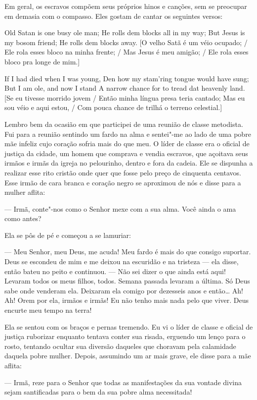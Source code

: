 Em geral, os escravos compõem seus
próprios hinos e canções, sem se preocupar em demasia com o compasso.
Eles gostam de cantar os seguintes versos:

Old Satan is one busy ole man; He rolls dem blocks all in my way; But
Jesus is my bosom friend; He rolls dem blocks away. {[}O velho Satã é um
véio ocupado; / Ele rola esses bloco na minha frente; / Mas Jesus é meu
amigão; / Ele rola esses bloco pra longe de mim.{]}

If I had died when I was young, Den how my stam'ring tongue would have
sung; But I am ole, and now I stand A narrow chance for to tread dat
heavenly land. {[}Se eu tivesse morrido jovem / Então minha língua presa
teria cantado; Mas eu sou véio e aqui estou, / Com pouca chance de
trilhá o terreno celestial.{]}

Lembro bem da ocasião em que participei
de uma reunião de classe metodista. Fui para a reunião sentindo um fardo
na alma e sentei"-me ao lado de uma pobre mãe infeliz cujo coração sofria
mais do que meu. O líder de classe era o oficial de justiça da cidade,
um homem que comprava e vendia escravos, que açoitava seus irmãos e
irmãs da igreja no pelourinho, dentro e fora da cadeia. Ele se dispunha
a realizar esse rito cristão onde quer que fosse pelo preço de cinquenta
centavos. Esse irmão de cara branca e coração negro se aproximou de nós
e disse para a mulher aflita:

--- Irmã, conte"-nos como o Senhor mexe com a sua alma. Você ainda o ama
como antes?

Ela se pôs de pé e começou a se
lamuriar:

--- Meu Senhor, meu Deus, me acuda! Meu fardo é mais do que consigo
suportar. Deus se escondeu de mim e me deixou na escuridão e na tristeza
--- ela disse, então bateu no peito e continuou. --- Não sei dizer o que
ainda está aqui! Levaram todos os meus filhos, todos. Semana passada
levaram a última. Só Deus sabe onde venderam ela. Deixaram ela comigo
por dezesseis anos e então\ldots{} Ah! Ah! Orem por ela, irmãos e irmãs!
Eu não tenho mais nada pelo que viver. Deus encurte meu tempo na terra!

Ela se sentou com os braços e pernas
tremendo. Eu vi o líder de classe e oficial de justiça ruborizar
enquanto tentava conter sua risada, erguendo um lenço para o rosto,
tentando ocultar sua diversão daqueles que choravam pela calamidade
daquela pobre mulher. Depois, assumindo um ar mais grave, ele disse para
a mãe aflita:

--- Irmã, reze para o Senhor que todas as manifestações da sua vontade
divina sejam santificadas para o bem da sua pobre alma necessitada!

